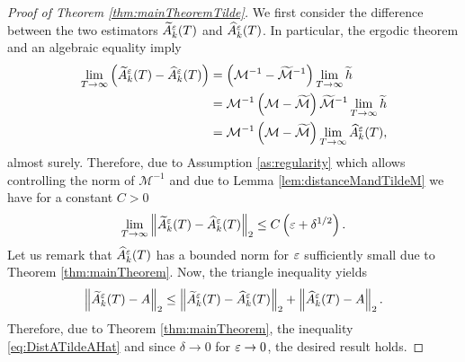 \documentclass[10pt]{article}
\begin{document}
\begin{appendices}
\begin{proof}[Proof of Theorem \ref{thm:mainTheoremTilde}] We first consider the difference between the two estimators $\widetilde A^\varepsilon_k(T)$ and $\widehat A^\varepsilon_k(T)$. In particular, the ergodic theorem and an algebraic equality imply
	\begin{equation}
	\begin{aligned}
	\lim_{T \to \infty} \left(\widetilde A^\varepsilon_k(T) - \widehat A^\varepsilon_k(T)\right) &= \left(\mathcal M^{-1} - \widetilde{\mathcal M}^{-1}\right) \lim_{T \to \infty}\widetilde h \\
	&= \mathcal M^{-1}\left(\mathcal M - \widetilde{\mathcal M}\right)  \widetilde{\mathcal M}^{-1} \lim_{T \to \infty} \widetilde h\\
	&= \mathcal M^{-1}\left(\mathcal M - \widetilde{\mathcal M}\right)\lim_{T \to \infty} \widehat A^\varepsilon_k(T),
	\end{aligned}
	\end{equation}
	almost surely. Therefore, due to Assumption \ref{as:regularity} which allows controlling the norm of $\mathcal M^{-1}$ and due to Lemma \ref{lem:distanceMandTildeM} we have for a constant $C > 0$
	\begin{equation}\label{eq:DistATildeAHat}
	\lim_{T \to \infty} \left\|\widetilde A^\varepsilon_k(T) - \widehat A^\varepsilon_k(T)\right\|_2 \leq C \left(\varepsilon + \delta^{1/2} \right).
	\end{equation}
	Let us remark that $\widehat A^\varepsilon_k(T)$ has a bounded norm for $\varepsilon$ sufficiently small due to Theorem \ref{thm:mainTheorem}. Now, the triangle inequality yields
	\begin{equation}
	\left\|\widetilde A^\varepsilon_k(T) - A\right\|_2 \leq \left\|\widetilde A^\varepsilon_k(T) - \widehat A^\varepsilon_k(T)\right\|_2 + \left\|\widehat A^\varepsilon_k(T) - A\right\|_2.
	\end{equation}
	Therefore, due to Theorem \ref{thm:mainTheorem}, the inequality \eqref{eq:DistATildeAHat} and since $\delta \to 0$ for $\varepsilon \to 0$, the desired result holds.
\end{proof}
\end{appendices}




\end{document}
